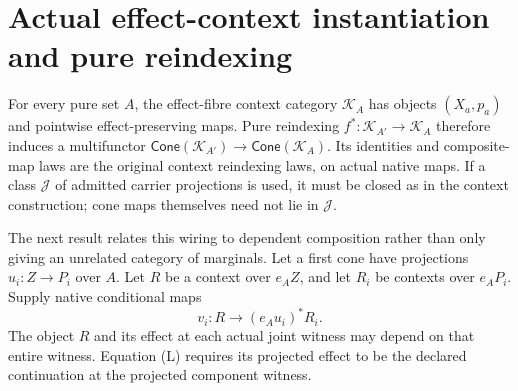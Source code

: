 \documentclass[11pt]{article}
\begin{document}
\section{Actual effect-context instantiation and pure reindexing}
For every pure set $A$, the effect-fibre context category $\mathcal K_A$ has objects $(X_a,p_a)$ and pointwise effect-preserving maps. Pure reindexing $f^*:\mathcal K_{A'}\to\mathcal K_A$ therefore induces a multifunctor $\mathsf{Cone}(\mathcal K_{A'})\to\mathsf{Cone}(\mathcal K_A)$. Its identities and composite-map laws are the original context reindexing laws, on actual native maps. If a class $\mathcal J$ of admitted carrier projections is used, it must be closed as in the context construction; cone maps themselves need not lie in $\mathcal J$.

The next result relates this wiring to dependent composition rather than only giving an unrelated category of marginals. Let a first cone have projections $u_i:Z\to P_i$ over $A$. Let $R$ be a context over $e_AZ$, and let $R_i$ be contexts over $e_AP_i$. Supply native conditional maps
\[
 v_i:R\longrightarrow(e_Au_i)^*R_i.
\tag{L}
\]
The object $R$ and its effect at each actual joint witness may depend on that entire witness. Equation (L) requires its projected effect to be the declared continuation at the projected component witness.
\end{document}
